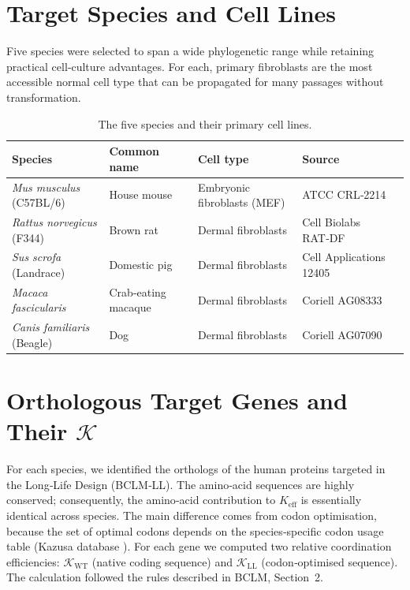\documentclass[12pt,a4paper]{article}
\newcommand{\REL}{\mathcal{K}}          %
\begin{document}
	\section{Target Species and Cell Lines}
	\label{sec:species}
	Five species were selected to span a wide phylogenetic range while retaining practical cell‑culture advantages. For each, primary fibroblasts are the most accessible normal cell type that can be propagated for many passages without transformation.
	
	\begin{table}[H]
		\centering
		\caption{The five species and their primary cell lines.}
		\label{tab:species}
		\begin{tabular}{@{}lllll@{}}
			\toprule
			\textbf{Species} & \textbf{Common name} & \textbf{Cell type} & \textbf{Source} \\
			\midrule
			\textit{Mus musculus} (C57BL/6) & House mouse & Embryonic fibroblasts (MEF) & ATCC CRL‑2214 \\
			\textit{Rattus norvegicus} (F344) & Brown rat & Dermal fibroblasts & Cell Biolabs RAT‑DF \\
			\textit{Sus scrofa} (Landrace) & Domestic pig & Dermal fibroblasts & Cell Applications 12405 \\
			\textit{Macaca fascicularis} & Crab‑eating macaque & Dermal fibroblasts & Coriell AG08333 \\
			\textit{Canis familiaris} (Beagle) & Dog & Dermal fibroblasts & Coriell AG07090 \\
			\bottomrule
		\end{tabular}
	\end{table}
	
	\section{Orthologous Target Genes and Their \(\REL\)}
	\label{sec:genes}
	For each species, we identified the orthologs of the human proteins targeted in the Long‑Life Design (BCLM‑LL). The amino‑acid sequences are highly conserved; consequently, the amino‑acid contribution to \(K_{\mathrm{eff}}\) is essentially identical across species. The main difference comes from codon optimisation, because the set of optimal codons depends on the species‑specific codon usage table (Kazusa database \cite{codon_usage_db}). For each gene we computed two relative coordination efficiencies: \(\REL_{\mathrm{WT}}\) (native coding sequence) and \(\REL_{\mathrm{LL}}\) (codon‑optimised sequence). The calculation followed the rules described in BCLM, Section~2.
	
\end{document}
